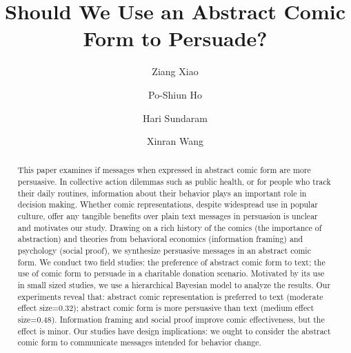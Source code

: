 \documentclass[format=acmsmall, natbib=false, review=false, authordraft=false, anonymous=true, screen=true]{acmart}
\begin{document}
\title[The Abstract Comic Form for Persuasion]{Should We Use an Abstract Comic Form to Persuade?}


\author{Ziang Xiao}
\author{Po-Shiun Ho}
\author{Hari Sundaram}
\author{Xinran Wang}




\begin{abstract}
 This paper examines if messages when expressed in abstract comic form are more persuasive. In collective action dilemmas such as public health, or for people who track their daily routines, information about their behavior plays an important role in decision making. Whether comic representations, despite widespread use in popular culture, offer any tangible benefits over plain text messages in persuasion is unclear and motivates our study. Drawing on a rich history of the comics (the importance of abstraction) and theories from behavioral economics (information framing) and psychology (social proof), we synthesize persuasive messages in an abstract comic form. We conduct two field studies: the preference of abstract comic form to text; the use of comic form to persuade in a charitable donation scenario. Motivated by its use in small sized studies, we use a hierarchical Bayesian model to analyze the results. Our experiments reveal that: abstract comic representation is preferred to text (moderate effect size=0.32); abstract comic form is more persuasive than text (medium effect size=0.48). Information framing and social proof improve comic effectiveness, but the effect is minor. Our studies have design implications: we ought to consider the abstract comic form to communicate messages intended for behavior change.
\end{abstract}
\end{document}
